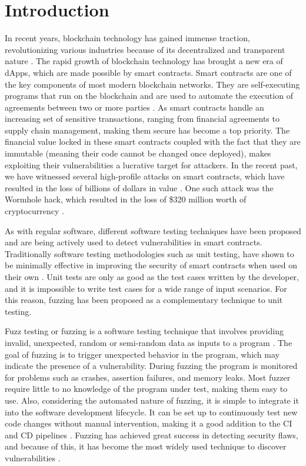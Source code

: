 
\chapter{Introduction}\label{chapter:introduction}
In recent years, blockchain technology has gained immense traction, revolutionizing various industries because of its decentralized and transparent nature \cite{noauthor_global_nodate}.
The rapid growth of blockchain technology has brought a new era of \acp{dApp}, which are made possible by smart contracts.
Smart contracts are one of the key components of most modern blockchain networks.
They are self-executing programs that run on the blockchain and are used to automate the execution of agreements between two or more parties \cite{zou_smart_2021}.
As smart contracts handle an increasing set of sensitive transactions, ranging from financial agreements to supply chain management, making them secure has become a top priority.
The financial value locked in these smart contracts coupled with the fact that they are immutable (meaning their code cannot be changed once deployed), makes exploiting their vulnerabilities a lucrative target for attackers.
In the recent past, we have witnessed several high-profile attacks on smart contracts, which have resulted in the loss of billions of dollars in value  \cite{noauthor_funds_nodate}.
One such attack was the Wormhole hack, which resulted in the loss of \$320 million worth of cryptocurrency \cite{faife_wormhole_2022}.

As with regular software, different software testing techniques have been proposed and are being actively used to detect vulnerabilities in smart contracts.
Traditionally software testing methodologies such as unit testing, have shown to be minimally effective in improving the security of smart contracts when used on their own \cite{noauthor_smart_nodate}.
Unit tests are only as good as the test cases written by the developer, and it is impossible to write test cases for a wide range of input scenarios.
For this reason, fuzzing has been proposed as a complementary technique to unit testing.

Fuzz testing or fuzzing is a software testing technique that involves providing invalid, unexpected, random or semi-random data as inputs to a program \cite{manes_art_2019}.
The goal of fuzzing is to trigger unexpected behavior in the program, which may indicate the presence of a vulnerability.
During fuzzing the program is monitored for problems such as crashes, assertion failures, and memory leaks.
Most fuzzer require little to no knowledge of the program under test, making them easy to use.
Also, considering the automated nature of fuzzing, it is simple to integrate it into the software development lifecycle.
It can be set up to continuously test new code changes without manual intervention, making it a good addition to the \ac{CI} and \ac{CD} pipelines \cite{klooster_effectiveness_2022}.
Fuzzing has achieved great success in detecting security flaws, and because of this, it has become the most widely used technique to discover vulnerabilities \cite{li_fuzzing_2018, zhu_fuzzing_2022}.

